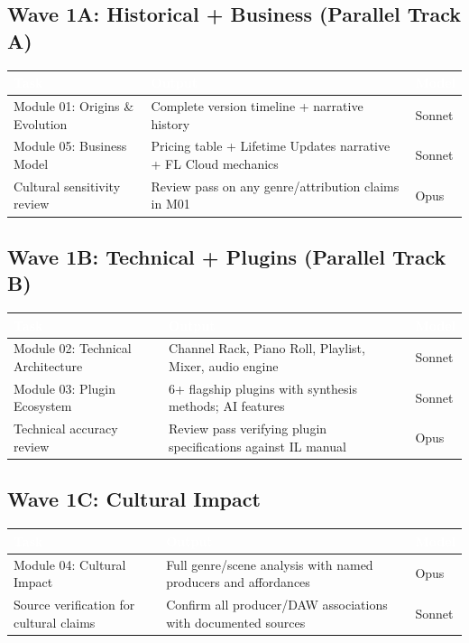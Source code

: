 \documentclass[11pt,letterpaper]{article}
\newcommand{\tableheader}[1]{\textbf{\sffamily\textcolor{white}{#1}}}
\begin{document}
\subsection{Wave 1A: Historical + Business (Parallel Track A)}

\begin{center}
\begin{tabularx}{\textwidth}{L{3.5cm}XC{2cm}}
\toprule
{}
\tableheader{Task} & \tableheader{Output} & \tableheader{Model} \\
\midrule
Module 01: Origins \& Evolution & Complete version timeline + narrative history & Sonnet \\
Module 05: Business Model & Pricing table + Lifetime Updates narrative + FL Cloud mechanics & Sonnet \\
Cultural sensitivity review & Review pass on any genre/attribution claims in M01 & Opus \\
\bottomrule
\end{tabularx}
\end{center}

\subsection{Wave 1B: Technical + Plugins (Parallel Track B)}

\begin{center}
\begin{tabularx}{\textwidth}{L{3.5cm}XC{2cm}}
\toprule
{}
\tableheader{Task} & \tableheader{Output} & \tableheader{Model} \\
\midrule
Module 02: Technical Architecture & Channel Rack, Piano Roll, Playlist, Mixer, audio engine & Sonnet \\
Module 03: Plugin Ecosystem & 6+ flagship plugins with synthesis methods; AI features & Sonnet \\
Technical accuracy review & Review pass verifying plugin specifications against IL manual & Opus \\
\bottomrule
\end{tabularx}
\end{center}

\subsection{Wave 1C: Cultural Impact}

\begin{center}
\begin{tabularx}{\textwidth}{L{3.5cm}XC{2cm}}
\toprule
{}
\tableheader{Task} & \tableheader{Output} & \tableheader{Model} \\
\midrule
Module 04: Cultural Impact & Full genre/scene analysis with named producers and affordances & Opus \\
Source verification for cultural claims & Confirm all producer/DAW associations with documented sources & Sonnet \\
\bottomrule
\end{tabularx}
\end{center}
\end{document}
